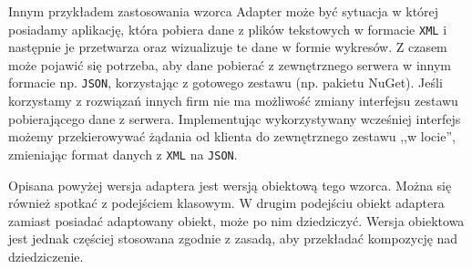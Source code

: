 


Innym przykładem zastosowania wzorca Adapter może być sytuacja w której posiadamy aplikację, która pobiera dane z plików tekstowych w formacie \texttt{XML} i następnie je przetwarza oraz wizualizuje te dane w formie wykresów. Z czasem może pojawić się potrzeba, aby dane pobierać z zewnętrznego serwera w innym formacie np. \texttt{JSON}, korzystając z gotowego zestawu (np. pakietu NuGet). Jeśli korzystamy z rozwiązań innych firm nie ma możliwość zmiany interfejsu zestawu pobierającego dane z serwera. Implementując wykorzystywany wcześniej interfejs możemy przekierowywać żądania od klienta do zewnętrznego zestawu ,,w locie'', zmieniając format danych z \texttt{XML} na \texttt{JSON}.

Opisana powyżej wersja adaptera jest wersją obiektową tego wzorca. Można się również spotkać z podejściem klasowym. W drugim podejściu obiekt adaptera zamiast posiadać adaptowany obiekt, może po nim dziedziczyć. Wersja obiektowa jest jednak częściej stosowana zgodnie z zasadą, aby przekładać kompozycję nad dziedziczenie.

